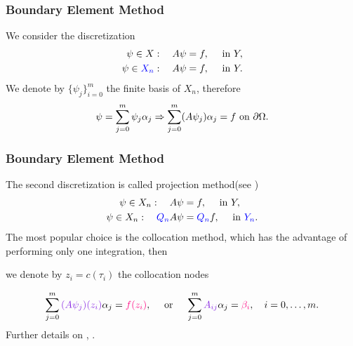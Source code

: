 \documentclass[handout]{beamer}
\newcommand{\upon}{\textup{ on }}
\begin{document}
\begin{frame}
 \frametitle{Boundary Element Method}
 We consider the discretization
  \begin{align}
  \psi\in X:\quad A\psi&=f,\quad\textup{ in }Y,\\
  \psi\in {\color{blue}X_n}:\quad A\psi&=f,\quad\textup{ in }Y.
  \end{align}
\pause
We denote by $\{\psi_j\}_{i=0}^m$ the finite basis of $X_n$, 
therefore
\begin{equation}
 \psi=\sum_{j=0}^m\psi_j\alpha_j\Rightarrow\sum_{j=0}^m(A\psi_j) \alpha_j = f \upon \partial\Omega.\label{eq:directlinear}
\end{equation}
\end{frame}
\begin{frame}
 \frametitle{Boundary Element Method}
 The second discretization is called {\color{blue}projection method}(see \cite{kirsch:book})
  \begin{align}
  \psi\in {X_n}:\quad A\psi&=f,\quad\textup{ in }Y, \\
  \psi\in {X_n}:\quad {\color{blue}Q_n}A\psi&={\color{blue}Q_n}f,\quad\textup{ in }{\color{blue}Y_n}.
  \end{align}
\pause
The most popular choice is the {\color{blue}collocation method}, which has the advantage of 
performing only one integration, then
\begin{center}
 we denote by $z_i = c(\tau_i)$ the collocation nodes
\end{center}
\begin{equation}
 \sum_{j=0}^m{\color{blue-violet}(A\psi_j)(z_i)} \alpha_j = {\color{brightpink}f(z_i)}, 
 \quad \textup{ or }\quad \sum_{j=0}^m{\color{blue-violet}A_{ij}}\alpha_j = {\color{brightpink}\beta_i}, 
 \quad i=0,\dots,m.\label{eq:bie-collocated}
\end{equation}
Further details on \cite{brebbia:book}, \cite{brebbia:book-progress}.
\end{frame}
\end{document}
